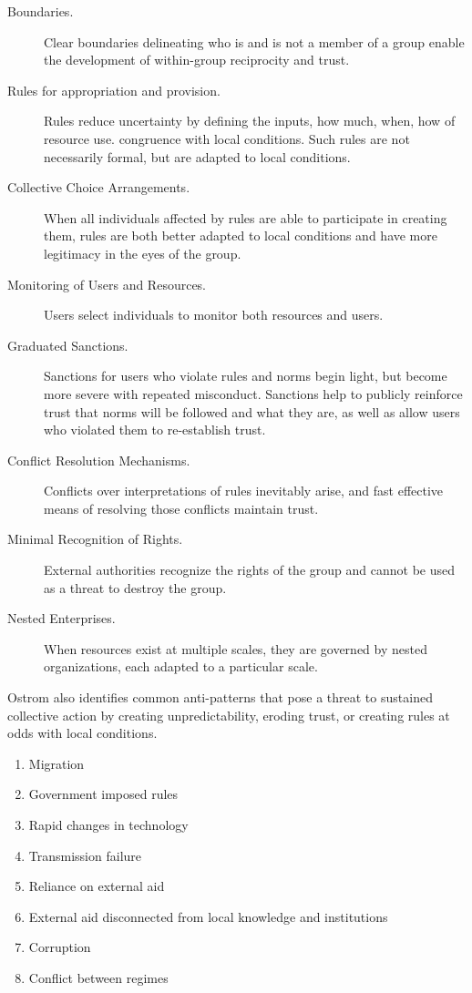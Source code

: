 \begin{description}
\item[Boundaries.]{Clear boundaries delineating who is and is not a member of a group enable the development of within-group reciprocity and trust.}
\item[Rules for appropriation and provision.]{Rules reduce uncertainty by defining the inputs, how much, when, how of resource use. congruence with local conditions. Such rules are not necessarily formal, but are adapted to local conditions.}
\item[Collective Choice Arrangements.]{When all individuals affected by rules are able to participate in creating them, rules are both better adapted to local conditions and have more legitimacy in the eyes of the group.}
\item[Monitoring of Users and Resources.]{Users select individuals to monitor both resources and users.}
\item[Graduated Sanctions.]{Sanctions for users who violate rules and norms begin light, but become more severe with repeated misconduct. Sanctions help to publicly reinforce trust that norms will be followed and what they are, as well as allow users who violated them to re-establish trust.}
\item[Conflict Resolution Mechanisms.]{Conflicts over interpretations of rules inevitably arise, and fast effective means of resolving those conflicts maintain trust.}
\item[Minimal Recognition of Rights.]{External authorities recognize the rights of the group and cannot be used as a threat to destroy the group.}
\item[Nested Enterprises.]{When resources exist at multiple scales, they are governed by nested organizations, each adapted to a particular scale.}
\end{description}

Ostrom also identifies common anti-patterns that pose a threat to sustained collective action by creating unpredictability, eroding trust, or creating rules at odds with local conditions.

\begin{enumerate}
\item{Migration}
\item{Government imposed rules}
\item{Rapid changes in technology}
\item{Transmission failure}
\item{Reliance on external aid}
\item{External aid disconnected from local knowledge and institutions}
\item{Corruption}
\item{Conflict between regimes}
\end{enumerate}

